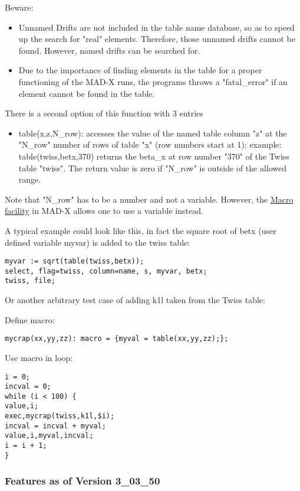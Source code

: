Beware: 
\begin{itemize}
   \item  Unnamed Drifts are not included in the table name
          database, so as to speed up the search for "real"
          elements. Therefore, those  unnamed drifts cannot be
          found. However, named drifts can be searched for.  
   \item  Due to the importance of finding elements in the table
          for a proper functioning of the MAD-X runs, the programs
          throws a "fatal\_error" if an element cannot be found in the
          table.   
\end{itemize}

There is a second option of this function with 3 entries  
\begin{itemize}
    \item table(x,z,N\_row): accesses the value of the named table
          column  "z" at the "N\_row" number of rows of table "x" (row
          numbers start at  1); example: table(twiss,betx,370) returns
          the beta\_x at row number  "370" of the Twiss table
          "twiss". The return value is zero if "N\_row"  is outside of
          the allowed range.
\end{itemize}

Note that "N\_row" has to be a number and not a  variable. However, the
\href{../control/special.html#macro}{Macro facility} in MAD-X  allows
one to use a variable instead.   

A typical example could look like this, in fact the square root of betx
(user defined variable myvar) is added to the twiss table:  
\begin{verbatim}
myvar := sqrt(table(twiss,betx));
select, flag=twiss, column=name, s, myvar, betx;
twiss, file;
\end{verbatim}

Or another arbitrary test case of adding k1l taken from the Twiss table: 

Define macro: 
\begin{verbatim}
mycrap(xx,yy,zz): macro = {myval = table(xx,yy,zz);};
\end{verbatim}

Use macro in loop: 
\begin{verbatim}
i = 0;
incval = 0;
while (i < 100) {
value,i;
exec,mycrap(twiss,k1l,$i);
incval = incval + myval;
value,i,myval,incval;                
i = i + 1;
}
\end{verbatim}

\subsubsection{Features as of Version 3\_03\_50}

